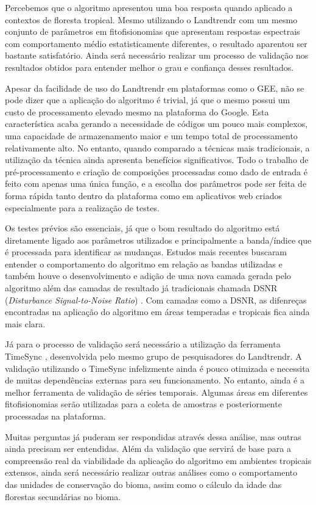 
Percebemos que o algoritmo apresentou uma boa resposta quando aplicado a contextos de floresta tropical. Mesmo utilizando o Landtrendr com um mesmo conjunto de parâmetros em fitofisionomias que apresentam respostas espectrais com comportamento médio estatisticamente diferentes, o resultado aparentou ser bastante satisfatório. Ainda será necessário realizar um processo de validação nos resultados obtidos para entender melhor o grau e confiança desses resultados.

Apesar da facilidade de uso do Landtrendr em plataformas como o GEE, não se pode dizer que a aplicação do algoritmo é trivial, já que o mesmo possui um custo de processamento elevado mesmo na plataforma do Google. Esta característica acaba gerando a necessidade de códigos um pouco mais complexos, uma capacidade de armazenamento maior e um tempo total de processamento relativamente alto. No entanto, quando comparado a técnicas mais tradicionais, a utilização da técnica ainda apresenta benefícios significativos. Todo o trabalho de pré-processamento e criação de composições processadas como dado de entrada é feito com apenas uma única função, e a escolha dos parâmetros pode ser feita de forma rápida tanto dentro da plataforma como em aplicativos web criados especialmente para a realização de testes. 

Os testes prévios são essenciais, já que o bom resultado do algoritmo está diretamente ligado aos parâmetros utilizados e principalmente a banda/índice que é processada para identificar as mudanças. Estudos mais recentes buscaram entender o comportamento do algoritmo em relação as bandas utilizadas e também houve o desenvolvimento e adição de uma nova camada gerada pelo algoritmo além das camadas de resultado já tradicionais chamada DSNR (\textit{Disturbance Signal-to-Noise Ratio}) \citep{COHEN2018131}. Com camadas como a DSNR, as difenreças encontradas na aplicação do algoritmo em áreas temperadas e tropicais fica ainda mais clara. 

Já para o processo de validação será necessário a utilização da ferramenta TimeSync \citep{COHEN20102911}, desenvolvida pelo mesmo grupo de pesquisadores do Landtrendr. A validação utilizando o TimeSync infelizmente ainda é pouco otimizada e necessita de muitas dependências externas para seu funcionamento. No entanto, ainda é a melhor ferramenta de validação de séries temporais. Algumas áreas em diferentes fitofisionomias serão utilizadas para a coleta de amostras e posteriormente processadas na plataforma.

Muitas perguntas já puderam ser respondidas através dessa análise, mas outras ainda precisam ser entendidas. Além da validação que servirá de base para a compreensão real da viabilidade da aplicação do algoritmo em ambientes tropicais extensos, ainda será necessário realizar outras análises como o comportamento das unidades de conservação do bioma, assim como o cálculo da idade das florestas secundárias no bioma. \citep{Brooks2014} 